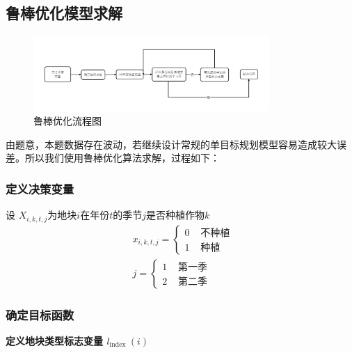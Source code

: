 \documentclass[12pt]{ctexart}
\begin{document}
	\subsection{鲁棒优化模型求解}
		\begin{figure}[h]
		\centering
		\includegraphics[width=0.8\textwidth]{image18.png}  %
		\caption{鲁棒优化流程图}
		\label{fig:yield_comparison1}
	\end{figure}
	
	由题意，本题数据存在波动，若继续设计常规的单目标规划模型容易造成较大误差。所以我们使用鲁棒优化算法求解，过程如下：
	\subsubsection{定义决策变量}
设 $X_{i, k, t, j}$为地块$i$在年份$t$的季节$j$是否种植作物$k$
\begin{equation}
\begin{aligned}
	& x_{i, k, t, j}= \begin{cases}0 & \text { 不种植 } \\
		1 & \text { 种植 }\end{cases} \\
	& j= \begin{cases}1 & \text { 第一季 } \\
		2 & \text { 第二季 }\end{cases}
\end{aligned}
\end{equation}

	\subsubsection{确定目标函数}
	\textbf{定义地块类型标志变量 $l_{\text {index }}(i)$}
	
\end{document}
